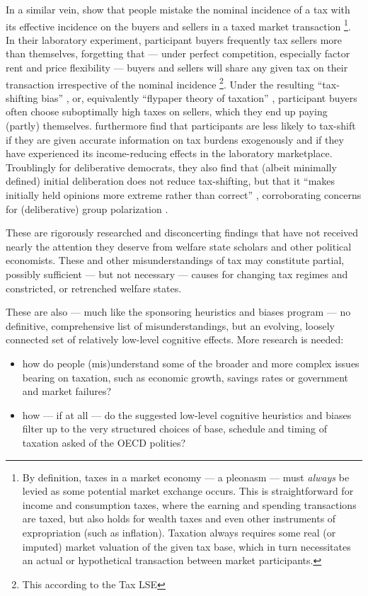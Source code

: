 In a similar vein, \cite{SausgruberTyran2011} show that people mistake the nominal incidence of a tax with its effective incidence on the buyers and sellers in a taxed market transaction
\footnote{
	By definition, taxes in a market economy --- a pleonasm --- must \emph{always} be levied as some potential market exchange occurs.
	This is straightforward for income and consumption taxes, where the earning and spending transactions are taxed, but also holds for wealth taxes and even other instruments of expropriation (such as inflation).
	Taxation always requires some real (or imputed) market valuation of the given tax base, which in turn necessitates an actual or hypothetical transaction between market participants.}. %
In their laboratory experiment, participant buyers frequently tax sellers more than themselves, forgetting that --- under perfect competition, especially factor rent and price flexibility --- buyers and sellers will share any given tax on their transaction irrespective of the nominal incidence \footnote{%
	This according to the \gls{Tax LSE}}.
Under the resulting ``tax-shifting bias'' \citep{SausgruberTyran2011}, or, equivalently ``flypaper theory of taxation'' \citep{McCafferyBaron2003}, participant buyers often choose suboptimally high taxes on sellers, which they end up paying (partly) themselves.
\citeauthor{SausgruberTyran2011} furthermore find that participants are less likely to tax-shift if they are given accurate information on tax burdens exogenously and if they have experienced its income-reducing effects in the laboratory marketplace. 
Troublingly for deliberative democrats, they also find that (albeit minimally defined) initial deliberation does not reduce tax-shifting, but that it ``makes initially held opinions more extreme rather than correct'' \citeyearpar[164]{SausgruberTyran2011}, corroborating concerns for (deliberative) group polarization \citep{Sunstein1991}.

These are rigorously researched and disconcerting findings that have not received nearly the attention they deserve from welfare state scholars and other political economists. 
These and other misunderstandings of tax may constitute partial, possibly sufficient --- but not necessary --- causes for changing tax regimes and constricted, or retrenched welfare states.

These are also --- much like the sponsoring heuristics and biases program --- no definitive, comprehensive list of misunderstandings, but an evolving, loosely connected set of relatively low-level cognitive effects.
More research is needed: 
\begin{itemize}
	\item how do people (mis)understand some of the broader and more complex issues bearing on taxation, such as economic growth, savings rates or government and market failures? 
	\item how --- if at all --- do the suggested low-level cognitive heuristics and biases filter up to the very structured choices of base, schedule and timing of taxation asked of the \gls{OECD} polities?
\end{itemize}


